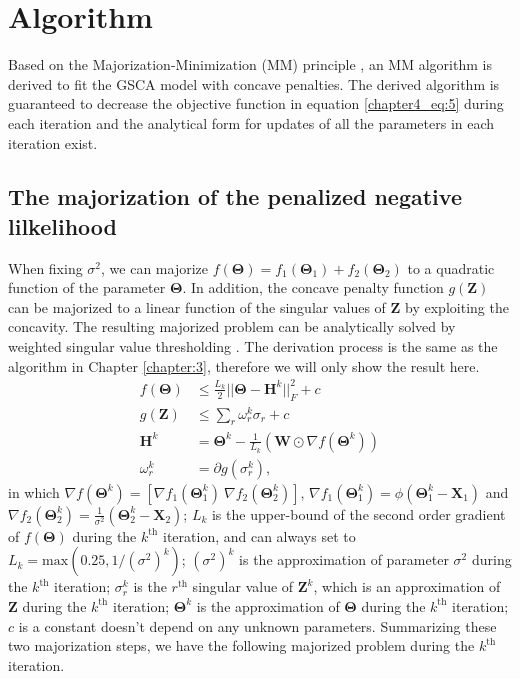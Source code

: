 \section{Algorithm}  \label{section:4.3}
Based on the Majorization-Minimization (MM) principle \cite{de1994block,hunter2004tutorial}, an MM algorithm is derived to fit the GSCA model with concave penalties. The derived algorithm is guaranteed to decrease the objective function in equation \ref{chapter4_eq:5} during each iteration and the analytical form for updates of all the parameters in each iteration exist.

\subsection{The majorization of the penalized negative lilkelihood}
When fixing $\sigma^2$, we can majorize $f(\mathbf{\Theta}) = f_1(\mathbf{\Theta}_1) + f_2(\mathbf{\Theta}_2)$ to a quadratic function of the parameter $\mathbf{\Theta}$. In addition, the concave penalty function $g(\mathbf{Z})$ can be majorized to a linear function of the singular values of $\mathbf{Z}$ by exploiting the concavity. The resulting majorized problem can be analytically solved by weighted singular value thresholding \cite{lu2015generalized}. The derivation process is the same as the algorithm in Chapter \ref{chapter:3}, therefore we will only show the result here.
\begin{equation}\label{chapter4_eq:6}
\begin{aligned}
f(\mathbf{\Theta}) &\leq \frac{L_k}{2}||\mathbf{\Theta}-\mathbf{H}^k||_F^2 + c\\
g(\mathbf{Z}) &\leq \sum_{r}\omega_{r}^k \sigma_r + c\\
              \mathbf{H}^k &= \mathbf{\Theta}^k - \frac{1}{L_k} (\mathbf{W}\odot \nabla f(\mathbf{\Theta}^k))\\
\omega_r^k &= \partial g(\sigma_r^k),
\end{aligned}
\end{equation}
in which $\nabla f(\mathbf{\Theta}^k) = [\nabla f_1(\mathbf{\Theta}_1^k) ~ \nabla f_2(\mathbf{\Theta}_2^k)]$, $\nabla f_1(\mathbf{\Theta}_1^k) =  \phi(\mathbf{\Theta}_1^k - \mathbf{X}_1)$ and $\nabla f_2(\mathbf{\Theta}_2^k) = \frac{1}{\sigma^2} (\mathbf{\Theta}_2^k - \mathbf{X}_2)$; $L_k$ is the upper-bound of the second order gradient of $f(\mathbf{\Theta})$ during the $k^{\text{th}}$ iteration, and can always set to $L_k = \text{max}(0.25, 1/(\sigma^2)^k)$; $(\sigma^2)^k$ is the approximation of parameter $\sigma^2$ during the $k^{\text{th}}$ iteration; $\sigma_r^k$ is the $r^{\text{th}}$ singular value of $\mathbf{Z}^{k}$, which is an approximation of $\mathbf{Z}$ during the $k^{\text{th}}$ iteration; $\mathbf{\Theta}^{k}$ is the approximation of $\mathbf{\Theta}$ during the $k^{\text{th}}$ iteration; $c$ is a constant doesn't depend on any unknown parameters. Summarizing these two majorization steps, we have the following majorized problem during the $k^{\text{th}}$ iteration.
